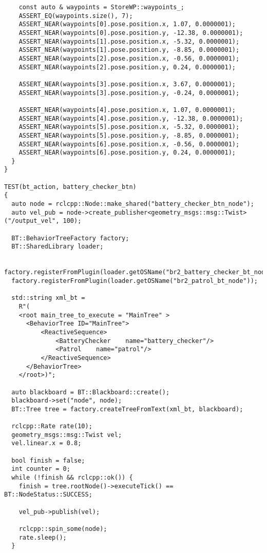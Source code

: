 \begin{tcolorbox}[sharp corners, colframe=gray!80, colback=LightGray, left=0pt, top=0pt, bottom=0pt, title=\texttt{br2\_bt\_patrolling/tests/bt\_action\_test.cpp}]
\begin{verbatim}
    const auto & waypoints = StoreWP::waypoints_;
    ASSERT_EQ(waypoints.size(), 7);
    ASSERT_NEAR(waypoints[0].pose.position.x, 1.07, 0.0000001);
    ASSERT_NEAR(waypoints[0].pose.position.y, -12.38, 0.0000001);
    ASSERT_NEAR(waypoints[1].pose.position.x, -5.32, 0.0000001);
    ASSERT_NEAR(waypoints[1].pose.position.y, -8.85, 0.0000001);
    ASSERT_NEAR(waypoints[2].pose.position.x, -0.56, 0.0000001);
    ASSERT_NEAR(waypoints[2].pose.position.y, 0.24, 0.0000001);

    ASSERT_NEAR(waypoints[3].pose.position.x, 3.67, 0.0000001);
    ASSERT_NEAR(waypoints[3].pose.position.y, -0.24, 0.0000001);

    ASSERT_NEAR(waypoints[4].pose.position.x, 1.07, 0.0000001);
    ASSERT_NEAR(waypoints[4].pose.position.y, -12.38, 0.0000001);
    ASSERT_NEAR(waypoints[5].pose.position.x, -5.32, 0.0000001);
    ASSERT_NEAR(waypoints[5].pose.position.y, -8.85, 0.0000001);
    ASSERT_NEAR(waypoints[6].pose.position.x, -0.56, 0.0000001);
    ASSERT_NEAR(waypoints[6].pose.position.y, 0.24, 0.0000001);
  }
}

TEST(bt_action, battery_checker_btn)
{
  auto node = rclcpp::Node::make_shared("battery_checker_btn_node");
  auto vel_pub = node->create_publisher<geometry_msgs::msg::Twist>("/output_vel", 100);

  BT::BehaviorTreeFactory factory;
  BT::SharedLibrary loader;

  factory.registerFromPlugin(loader.getOSName("br2_battery_checker_bt_node"));
  factory.registerFromPlugin(loader.getOSName("br2_patrol_bt_node"));

  std::string xml_bt =
    R"(
    <root main_tree_to_execute = "MainTree" >
      <BehaviorTree ID="MainTree">
          <ReactiveSequence>
              <BatteryChecker    name="battery_checker"/>
              <Patrol    name="patrol"/>
          </ReactiveSequence>
      </BehaviorTree>
    </root>)";

  auto blackboard = BT::Blackboard::create();
  blackboard->set("node", node);
  BT::Tree tree = factory.createTreeFromText(xml_bt, blackboard);

  rclcpp::Rate rate(10);
  geometry_msgs::msg::Twist vel;
  vel.linear.x = 0.8;

  bool finish = false;
  int counter = 0;
  while (!finish && rclcpp::ok()) {
    finish = tree.rootNode()->executeTick() == BT::NodeStatus::SUCCESS;

    vel_pub->publish(vel);

    rclcpp::spin_some(node);
    rate.sleep();
  }


\end{verbatim}
\end{tcolorbox}
